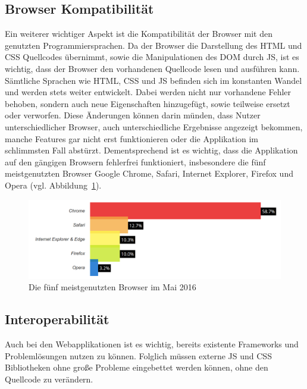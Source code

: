 \subsection{Browser Kompatibilität}
\label{sec:Browser Kompatibilität}
Ein weiterer wichtiger Aspekt ist die Kompatibilität der Browser mit den genutzten Programmiersprachen. Da der Browser die Darstellung des \ac{HTML} und \ac{CSS} Quellcodes übernimmt, sowie die Manipulationen des DOM durch \ac{JS}, ist es wichtig, dass der Browser den vorhandenen Quellcode lesen und ausführen kann. Sämtliche Sprachen wie \ac{HTML}, \ac{CSS} und \ac{JS} befinden sich im konstanten Wandel und werden stets weiter entwickelt.
Dabei werden nicht nur vorhandene Fehler behoben, sondern auch neue Eigenschaften hinzugefügt, sowie teilweise ersetzt oder verworfen. Diese Änderungen können darin münden, dass Nutzer unterschiedlicher Browser, auch unterschiedliche Ergebnisse angezeigt bekommen, manche Features gar nicht erst funktionieren oder die Applikation im schlimmsten Fall abstürzt. Dementsprechend ist es wichtig, dass die Applikation auf den gängigen Browsern fehlerfrei funktioniert, insbesondere die fünf meistgenutzten Browser Google Chrome, Safari, Internet Explorer, Firefox und Opera (vgl. Abbildung~\ref{fig:browser-may-2016}).

\begin{figure}[hb]
  \centering  
  \includegraphics[scale=0.3]{img/browser_2016.png}
  \caption{Die fünf meistgenutzten Browser im Mai 2016 \cite{top-five-browser-statistics}}\label{fig:browser-may-2016}
\end{figure}

\subsection{Interoperabilität}
\label{sec:Interoperabilität_Analyse}
Auch bei den Webapplikationen ist es wichtig, bereits existente Frameworks und Problemlösungen nutzen zu können. Folglich müssen externe \ac{JS} und \ac{CSS} Bibliotheken ohne große Probleme eingebettet werden können, ohne den Quellcode zu verändern.


